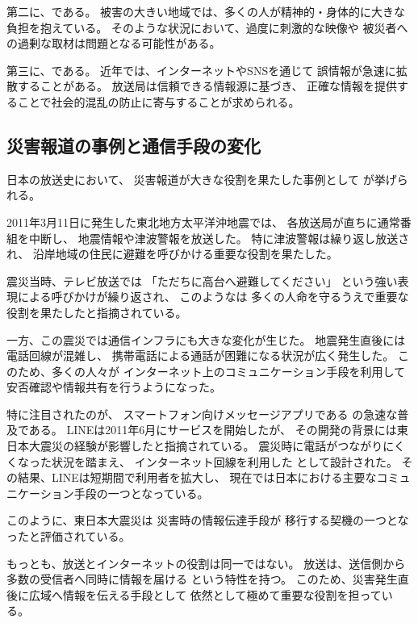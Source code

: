 第二に、である。
被害の大きい地域では、多くの人が精神的・身体的に大きな負担を抱えている。
そのような状況において、過度に刺激的な映像や
被災者への過剰な取材は問題となる可能性がある。

第三に、である。
近年では、インターネットやSNSを通じて
誤情報が急速に拡散することがある。
放送局は信頼できる情報源に基づき、
正確な情報を提供することで社会的混乱の防止に寄与することが求められる。

\subsection{災害報道の事例と通信手段の変化}

日本の放送史において、
災害報道が大きな役割を果たした事例として
が挙げられる。

2011年3月11日に発生した東北地方太平洋沖地震では、
各放送局が直ちに通常番組を中断し、
地震情報や津波警報を放送した。
特に津波警報は繰り返し放送され、
沿岸地域の住民に避難を呼びかける重要な役割を果たした。

震災当時、テレビ放送では
「ただちに高台へ避難してください」
という強い表現による呼びかけが繰り返され、
このようなは
多くの人命を守るうえで重要な役割を果たしたと指摘されている。

一方、この震災では通信インフラにも大きな変化が生じた。
地震発生直後には電話回線が混雑し、
携帯電話による通話が困難になる状況が広く発生した。
このため、多くの人々が
インターネット上のコミュニケーション手段を利用して
安否確認や情報共有を行うようになった。

特に注目されたのが、
スマートフォン向けメッセージアプリである
の急速な普及である。
LINEは2011年6月にサービスを開始したが、
その開発の背景には東日本大震災の経験が影響したと指摘されている。
震災時に電話がつながりにくくなった状況を踏まえ、
インターネット回線を利用した
として設計された。
その結果、LINEは短期間で利用者を拡大し、
現在では日本における主要なコミュニケーション手段の一つとなっている。

このように、東日本大震災は
災害時の情報伝達手段が
移行する契機の一つとなったと評価されている。

もっとも、放送とインターネットの役割は同一ではない。
放送は、送信側から多数の受信者へ同時に情報を届ける
という特性を持つ。
このため、災害発生直後に広域へ情報を伝える手段として
依然として極めて重要な役割を担っている。

